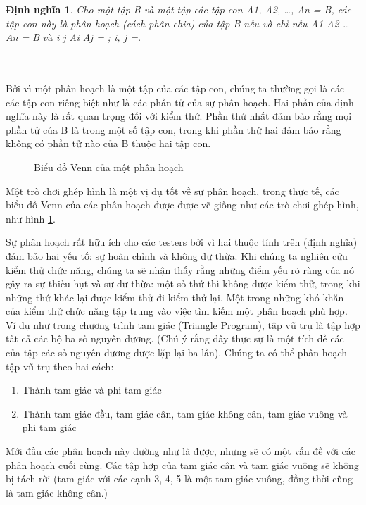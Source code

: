 \documentclass[11pt,a4paper,oneside]{article}
\newtheorem{modeling_def}{Định nghĩa }
\begin{document}
\begin{modeling_def}
Cho một tập B và một tập các tập con A1, A2, \dots, An = B, các tập con này là phân hoạch (cách phân chia) của tập B nếu và chỉ nếu A1 \cup A2 \cup \dots \cup An = B $ và $ i \neq j \Rightarrow Ai \cap Aj = \emptyset; i, j =.
\end{modeling_def}
\\
\\
Bởi vì một phân hoạch là một tập của các tập con, chúng ta thường gọi là các các tập con riêng biệt như là các phần tử của sự phân hoạch. Hai phần của định nghĩa này là rất quan trọng đối với kiểm thử. Phần thứ nhất đảm bảo rằng mọi phần tử của B là trong một số tập con, trong khi phần thứ hai đảm bảo rằng không có phần tử nào của B thuộc hai tập con.
\begin{figure}[htb]
\setlength\fboxsep{1mm}
\setlength\fboxrule{1pt}
\begin{center}
\caption{Biểu đồ Venn của một phân hoạch}
\label{fig:mtran_ima3}
\end{center}
\end{figure}

Một trò chơi ghép hình là một vị dụ tốt về sự phân hoạch, trong thực tế, các biểu đồ Venn của các phân hoạch được được vẽ giống như các trò chơi ghép hình, như hình \ref{fig:mtran_ima3}.

Sự phân hoạch rất hữu ích cho các testers bởi vì hai thuộc tính trên (định nghĩa) đảm bảo hai yếu tố: sự hoàn chỉnh và không dư thừa. Khi chúng ta nghiên cứu kiểm thử chức năng, chúng ta sẽ nhận thấy rằng những điểm yếu rõ ràng của nó gây ra sự thiếu hụt và sự dư thừa: một số thứ thì không được kiểm thử, trong khi những thứ khác lại được kiểm thử đi kiểm thử lại. Một trong những khó khăn của kiểm thử chức năng tập trung vào việc tìm kiếm một phân hoạch phù hợp. Ví dụ như trong chương trình tam giác (Triangle Program), tập vũ trụ là tập hợp tất cả các bộ ba số nguyên dương. (Chú ý rằng đây thực sự là một tích đề các của tập các số nguyên dương được lặp lại ba lần). Chúng ta có thể phân hoạch tập vũ trụ theo hai cách:
\begin{enumerate}
\item Thành tam giác và phi tam giác
\item Thành tam giác đều, tam giác cân, tam giác không cân, tam giác vuông và phi tam giác
\end{enumerate}
Mới đầu các phân hoạch này dường như là được, nhưng sẽ có một vấn đề với các phân hoạch cuối cùng. Các tập hợp của tam giác cân và tam giác vuông sẽ không bị tách rời (tam giác với các cạnh 3, 4, 5 là một tam giác vuông, đồng thời cũng là tam giác không cân.)
\end{document}
